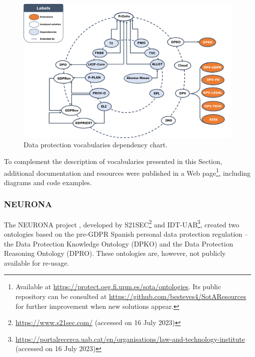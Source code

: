\begin{figure}
\caption{Data protection vocabularies dependency chart.}
\label{fig:voc_dependency_graph}
\centering
\includegraphics[width=\textwidth]{figures/chapter-2/vocabs.png}
\end{figure}

To complement the description of vocabularies presented in this Section, additional documentation and resources were published in a Web page\footnote{Available at \url{https://protect.oeg.fi.upm.es/sota/ontologies}. Its public repository can be consulted at \url{https://github.com/besteves4/SotAResources} for further improvement when new solutions appear.}, including diagrams and code examples.

\subsubsection{NEURONA}
\label{sec:neurona}

The NEURONA project \citep{casellas_ontological_2010}, developed by S21SEC\footnote{\url{https://www.s21sec.com/} (accessed on 16 July 2023)} and IDT-UAB\footnote{\url{https://portalrecerca.uab.cat/en/organisations/law-and-technology-institute} (accessed on 16 July 2023)}, created two ontologies based on the pre-GDPR Spanish personal data protection regulation \citeyearpar{noauthor_real_2008} -- the Data Protection Knowledge Ontology (DPKO) and the Data Protection Reasoning Ontology (DPRO).
These ontologies are, however, not publicly available for re-usage.

